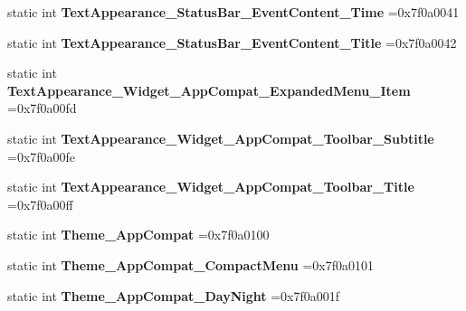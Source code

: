 \begin{DoxyCompactItemize}
static int {\bfseries Text\+Appearance\+\_\+\+Status\+Bar\+\_\+\+Event\+Content\+\_\+\+Time} =0x7f0a0041
\item 
\mbox{\label{classandroid_1_1support_1_1design_1_1R_1_1style_a17005247aac3b6d4aa550eabc318e771}} 
static int {\bfseries Text\+Appearance\+\_\+\+Status\+Bar\+\_\+\+Event\+Content\+\_\+\+Title} =0x7f0a0042
\item 
\mbox{\label{classandroid_1_1support_1_1design_1_1R_1_1style_a1c9c770596691a7bd89024c99a315bbd}} 
static int {\bfseries Text\+Appearance\+\_\+\+Widget\+\_\+\+App\+Compat\+\_\+\+Expanded\+Menu\+\_\+\+Item} =0x7f0a00fd
\item 
\mbox{\label{classandroid_1_1support_1_1design_1_1R_1_1style_ade3cbe8be2bd0ef20828d8db43c47f85}} 
static int {\bfseries Text\+Appearance\+\_\+\+Widget\+\_\+\+App\+Compat\+\_\+\+Toolbar\+\_\+\+Subtitle} =0x7f0a00fe
\item 
\mbox{\label{classandroid_1_1support_1_1design_1_1R_1_1style_a317af542f767fa3cc07dfa045f948b28}} 
static int {\bfseries Text\+Appearance\+\_\+\+Widget\+\_\+\+App\+Compat\+\_\+\+Toolbar\+\_\+\+Title} =0x7f0a00ff
\item 
\mbox{\label{classandroid_1_1support_1_1design_1_1R_1_1style_ae30e25e8faf3a56c0c87927063029039}} 
static int {\bfseries Theme\+\_\+\+App\+Compat} =0x7f0a0100
\item 
\mbox{\label{classandroid_1_1support_1_1design_1_1R_1_1style_af5920884273642cebe2e1d90fccee628}} 
static int {\bfseries Theme\+\_\+\+App\+Compat\+\_\+\+Compact\+Menu} =0x7f0a0101
\item 
\mbox{\label{classandroid_1_1support_1_1design_1_1R_1_1style_ac02dfc545ff0da8d486b5b132fd13aff}} 
static int {\bfseries Theme\+\_\+\+App\+Compat\+\_\+\+Day\+Night} =0x7f0a001f
\item 
\mbox{\label{classandroid_1_1support_1_1design_1_1R_1_1style_a0675faf749fdb964b2094a166922afe0}} 

\end{DoxyCompactItemize}
